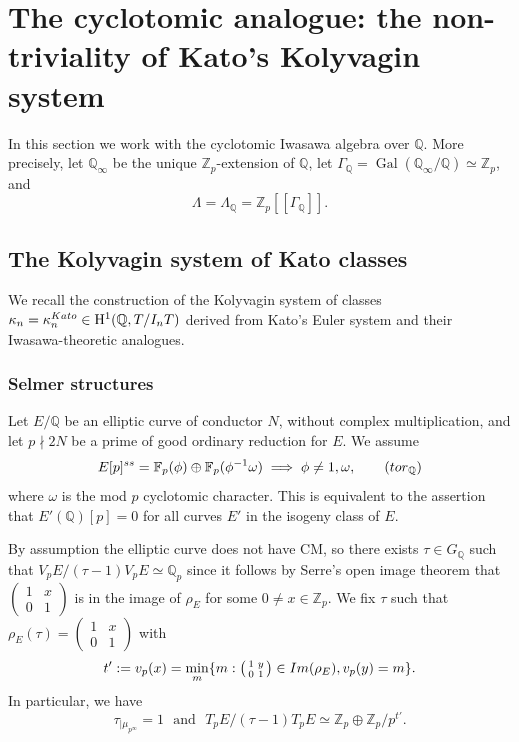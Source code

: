 \documentclass[10pt,reqno]{amsart}
\numberwithin{equation}{section}
\theoremstyle{plain}
\theoremstyle{definition}
\theoremstyle{definition}
\theoremstyle{plain}
\theoremstyle{plain}
\theoremstyle{plain}
\theoremstyle{plain}
\theoremstyle{plain}
\theoremstyle{plain}
\newcommand{\Z}{\mathbb{Z}}
\newcommand{\Q}{\mathbb{Q}}
\DeclareMathOperator{\gal}{Gal}
\newcommand{\rH}{\mathrm{H}}
\begin{document}
\section{The cyclotomic analogue: the non-triviality of Kato's Kolyvagin system}
In this section we work with the cyclotomic Iwasawa algebra over $\Q$. More precisely, let $\Q_{\infty}$ be the unique $\Z_p$-extension of $\Q$, let $ \Gamma_\Q=\gal(\Q_{\infty}/\Q)\simeq \Z_p$, and
\[
\Lambda=\Lambda_\Q=\Z_p[[\Gamma_\Q]].
\]
\subsection{The Kolyvagin system of Kato classes}
We recall the construction of the Kolyvagin system of classes $\kappa_{n}=\kappa_{n}^{\rm Kato}\in \rH^1(\Q,T/I_nT)$ derived from Kato's Euler system and their Iwasawa-theoretic analogues. 
\subsubsection{Selmer structures}\label{selstr2}
Let $E/\Q$ be an elliptic curve of conductor $N$, without complex multiplication, 
and let $p\nmid 2N$ be a prime of good ordinary reduction for $E$. We assume 
\begin{equation}\label{eq:noQtors}
E[p]^{ss} = \mathbb{F}_p(\phi)\oplus\mathbb{F}_p(\phi^{-1}\omega) \implies \phi\neq 1 ,\omega,\tag{${\rm tor}_{\mathbb{Q}}$}
\end{equation}
where $\omega$ is the mod $p$ cyclotomic character. This is equivalent to the assertion that $E'(\Q)[p] =0$ for all curves $E'$ in the isogeny class of $E$.

By assumption the elliptic curve does not have CM, so there exists $\tau\in G_\Q$ such that $V_pE/(\tau-1)V_pE\simeq \Q_p$ since it follows by Serre's open image theorem \cite{serre} that $\left(\begin{smallmatrix}1&x\\0&1\end{smallmatrix}\right)$ is in the image of $\rho_E$ for some $0\neq x\in \Z_p$. We fix $\tau$ such that $\rho_E(\tau)=\left(\begin{smallmatrix}1&x\\0&1\end{smallmatrix}\right)$ with $$t':=v_p(x)=\min_m\{m:\left(\begin{smallmatrix}1&y\\0&1\end{smallmatrix}\right)\in {\rm Im}(\rho_E), v_p(y)=m\}.$$ In particular, we have
\begin{equation}\label{eq:tau}
\tau_{|\mu_{p^{\infty}}}=1 \ \ \ \text{and}  \ \ \ T_pE/(\tau-1)T_pE\simeq\Z_p \oplus \Z_p/p^{t'}.\tag{$\tau$}
\end{equation}
\end{document}
